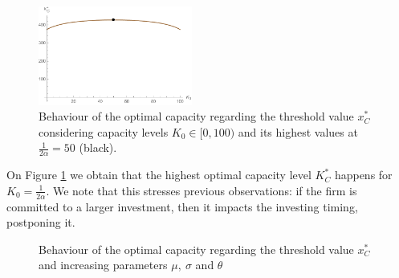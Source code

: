\begin{figure}[!htb]
	\centering
	\includegraphics[width=0.45\textwidth]{Prob2_CapOpt/koptx_k0.pdf}
	\caption{Behaviour of the optimal capacity regarding the threshold value $x^*_C$ considering capacity levels $K_0 \in [0, 100)$ and its highest values at $\frac{1}{2 \alpha}=50$ (black).}
	\label{fig:2_k0}
\end{figure}

On Figure \ref{fig:2_k0} we obtain that the highest optimal capacity level $K^*_C$ happens for $K_0=\frac{1}{2 \alpha}$.
We note that this stresses previous observations: if the firm is committed to a larger investment, then it impacts the investing timing, postponing it.

\vspace{0.5cm}

\begin{figure}[!htb]
	\begin{subfigmatrix}{3}
	\end{subfigmatrix}
	\caption{Behaviour of the optimal capacity regarding the threshold value $x^*_C$ and increasing parameters $\mu, \ \sigma$ and $\theta$}
	\label{fig:2_k1}
\end{figure}

